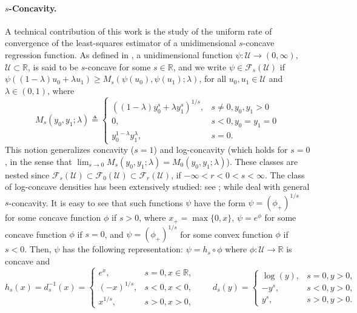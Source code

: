 \documentclass{article} %
\begin{document}
\paragraph{\ensuremath{s}-Concavity.}\label{sec:s-concavity}
A technical contribution of this work is the study of the uniform rate of convergence of the least-squares estimator of a unidimensional $s$-concave regression function. As defined in \cite{han2016approximation}, a unidimensional function $\psi:\mathcal{U} \rightarrow (0,\infty)$, $\mathcal{U} \subset \mathbb{R}$, is said to be $s$-concave for some $s \in \mathbb{R}$, and we write $\psi \in \mathcal{F}_{s}(\mathcal{U})$ if $\psi\left((1-\lambda) u_0+\lambda u_1\right) \geq M_s\left(\psi\left(u_0\right), \psi\left(u_1\right) ; \lambda\right)$, for all $u_0, u_1 \in \mathcal{U}$ and $\lambda \in (0,1)$, where
$$
M_s(y_0, y_1 ; \lambda) \triangleq \begin{cases}((1-\lambda) y_0^s+\lambda y_1^s)^{1 / s}, & s \neq 0, y_0, y_1 > 0 \\ 
0, & s<0, y_0=y_1=0\\
y_0^{1-\lambda} y_1^{\lambda}, & s=0.\end{cases}
$$
\noindent
This notion generalizes concavity ($s=1$) and log-concavity (which holds for $s=0$, in the sense that $\lim_{s\rightarrow 0}M_s(y_0,y_1;\lambda)=M_0(y_0,y_1;\lambda)$). These classes are nested since
$\mathcal{F}_{s}(\mathcal{U}) \subset \mathcal{F}_{0}(\mathcal{U}) \subset \mathcal{F}_{r}(\mathcal{U})$, if $-\infty<r<0<s<\infty$. The class of log-concave densities has been extensively studied: see  \cite{bobkov2011concentration, dumbgen2009maximum, cule2010theoretical, borzadaran2011log, bagnoli2006log}; while \cite{han2016approximation, doss2016global, chandrasekaran2009sampling, koenker2010quasi} deal with general $s$-concavity. It is easy to see that such functions $\psi$ have the form $\psi = (\phi_{+})^{1/s}$ for some concave function $\phi$  if $s>0$, where $x_{+}=\max \{0,x\}$, $\psi = e^\phi$ for some concave function $\phi$  if $s=0$, and $\psi = (\phi_{+})^{1/s}$ for some convex function $\phi$ if $s<0$. Then, $\psi$ has the following representation: $\psi = h_s \circ \phi$ where $\phi:\mathcal{U}\rightarrow\mathbb{R}$ is concave and
\begin{equation}\label{eq:def-d_s-and-inverse}
  h_s(x)= d_s^{-1}(x) = \begin{cases}e^x, & s=0, x \in \mathbb{R},\\ (-x)^{1 / s}, & s<0, x < 0 ,
  \\ x^{1 / s}, & s>0, x > 0 ,\end{cases} \qquad d_s(y)= \begin{cases}\log (y), & s=0, y>0, \\ -y^s, & s<0, y>0,\\ y^s, & s>0, y>0.\end{cases}
\end{equation}
\end{document}
